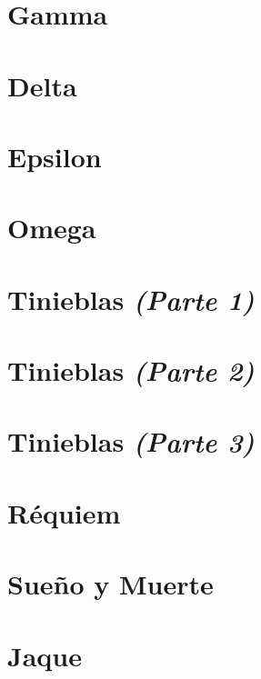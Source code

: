 \documentclass[11pt]{book}
\begin{document}
\chapter{Gamma}


\chapter{Delta}


\chapter{Epsilon}


\chapter{Omega}


\chapter{Tinieblas \emph{\mdseries(Parte 1)}}


\chapter{Tinieblas \emph{\mdseries(Parte 2)}}


\chapter{Tinieblas \emph{\mdseries(Parte 3)}}


\chapter{Réquiem}


\chapter{Sueño y Muerte}


\chapter{Jaque}

\end{document}
